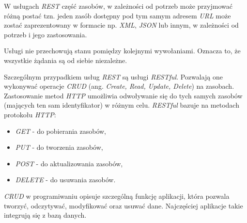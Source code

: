 W usługach \textsl{REST} część zasobów, w zależności od potrzeb może przyjmować różną postać tzn. jeden zasób dostępny pod tym samym adresem \textsl{URL} może zostać zaprezentowany w formacie np. \textsl{XML}, \textsl{JSON} lub innym, w zależności od potrzeb i jego zastosowania.

Usługi nie przechowują stanu pomiędzy kolejnymi wywołaniami. Oznacza to, że wszystkie żądania są od siebie niezależne.

Szczególnym przypadkiem usług \textsl{REST} są usługi \textsl{RESTful}. Pozwalają one wykonywać operacje \textsl{CRUD} (ang. \textsl{Create, Read, Update, Delete}) na zasobach. Zastosowanie metod \textsl{HTTP} umożliwia odwoływanie się do tych samych zasobów (mających ten sam identyfikator) w różnym celu. \textsl{RESTful} bazuje na metodach protokołu \textsl{HTTP}:
\begin{itemize}
    \item \textsl{GET} - do pobierania zasobów,
    \item \textsl{PUT} - do tworzenia zasobów,
    \item \textsl{POST} - do aktualizowania zasobów,
    \item \textsl{DELETE} - do usuwania zasobów.
\end{itemize} 

\textsl{CRUD} w programiwaniu opisuje szczególną funkcję aplikacji, która pozwala tworzyć, odczytywać, modyfikować oraz usuwać dane. Najczęściej aplikacje takie integrują się z bazą danych. 